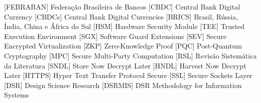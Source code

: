  [FEBRABAN] {Federação Brasileira de Bancos}
 [CBDC] {Central Bank Digital Currency}
 [CBDCs] {Central Bank Digital Currencies}
 [BRICS] {Brasil, Rússia, Índia, China e África do Sul}
 [HSM] {Hardware Security Module}
 [TEE] {Trusted Execution Environment}
 [SGX] {Software Guard Extensions}
 [SEV] {Secure Encrypted Virtualization}
 [ZKP] {Zero-Knowledge Proof}
 [PQC] {Post-Quantum Cryptography}
 [MPC] {Secure Multi-Party Computation}
 [RSL] {Revisão Sistemática da Literatura}
 [SNDL] {Store Now Decrypt Later}
 [HNDL] {Harvest Now Decrypt Later}
 [HTTPS] {Hyper Text Transfer Protocol Secure}
 [SSL] {Secure Sockets Layer}
 [DSR] {Design Science Research}
 [DSRMIS] {DSR Methodology for Information Systems}
